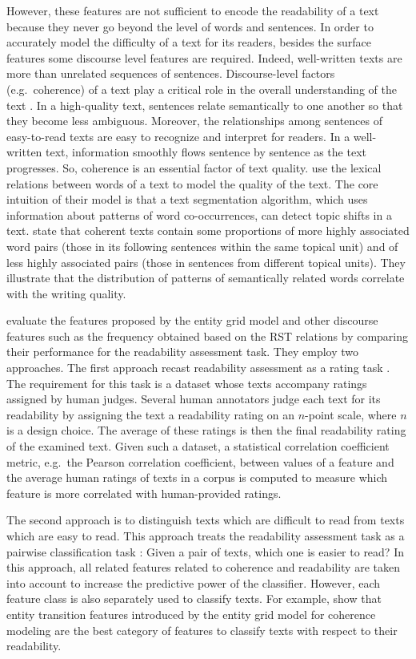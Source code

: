 However, these features are not sufficient to encode the readability of a text because they never go beyond the level of words and sentences. 
In order to accurately model the difficulty of a text for its readers, besides the surface features some discourse level features are required. 
Indeed, well-written texts are more than unrelated sequences of sentences. 
Discourse-level factors (e.g.\ coherence) of a text play a critical role in the overall understanding of the text \cite{pitler08}.  
In a high-quality text, sentences relate semantically to one another so that they become less ambiguous.   
Moreover, the relationships among sentences of \mbox{easy-to-read} texts are easy to recognize and interpret for readers. 
In a well-written text, information smoothly flows sentence by sentence as the text progresses.   
So, coherence is an essential factor of text quality. 
 use the lexical relations between words of a text to model the quality of the text. 
The core intuition of their model is that a text segmentation algorithm, which uses information about patterns of word co-occurrences, can detect topic shifts in a text. 
 state that coherent texts contain some proportions of more highly associated word pairs (those in its following sentences within the same topical unit) and of less highly associated pairs (those in sentences from different topical units).  
They illustrate that the distribution of patterns of semantically related words correlate with the writing quality. 

 evaluate the features proposed by the entity grid model and other discourse features such as the frequency obtained based on the RST relations by comparing their performance for the readability assessment task. 
They employ two approaches. 
The first approach recast readability assessment as a rating task \cite{pitler08,kate10}. 
The requirement for this task is a dataset whose texts accompany ratings assigned by human judges. 
Several human annotators judge each text for its readability by assigning the text a readability rating on an $n$-point scale, where $n$ is a design choice. 
The average of these ratings is then the final readability rating of the examined text.  
Given such a dataset, a statistical correlation coefficient metric, e.g.\ the Pearson correlation coefficient, between values of a feature and the average human ratings of texts in a corpus is computed to measure which feature is more correlated with human-provided ratings. 

The second approach is to distinguish texts which are difficult to read from texts which are easy to read. 
This approach treats the readability assessment task as a pairwise classification task \cite{pitler08,guinaudeau13,barzilay08}: Given a pair of texts, which one is easier to read? 
In this approach, all related features related to coherence and readability are taken into account to increase the predictive power of the classifier. 
However, each feature class is also separately used to classify texts.   
For example,  show that entity transition features introduced by the entity grid model for coherence modeling are the best category of features to classify texts with respect to their readability. 

